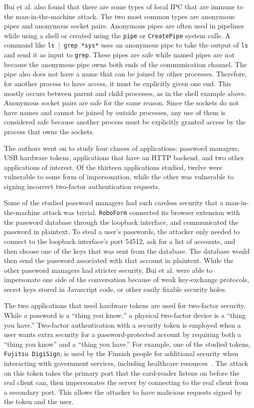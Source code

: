 Bui et al. also found that there are some types of local IPC that are immune to the man-in-the-machine attack.  The two most common types are anonymous pipes and anonymous socket pairs.  Anonymous pipes are often used in pipelines while using a shell or created using the \texttt{pipe} or \texttt{CreatePipe} system calls.  A command like \texttt{ls $|$ grep *sys*} uses an anonymous pipe to take the output of \texttt{ls} and send it as input to \texttt{grep}.  These pipes are safe while named pipes are not because the anonymous pipe owns both ends of the communication channel.  The pipe also does not have a name that can be joined by other processes.  Therefore, for another process to have access, it must be explicitly given one end.  This mostly occurs between parent and child processes, as in the shell example above.  Anonymous socket pairs are safe for the same reason.  Since the sockets do not have names and cannot be joined by outside processes, any use of them is considered safe because another process must be explicitly granted access by the process that owns the sockets.

The authors went on to study four classes of applications: password managers, USB hardware tokens, applications that have an HTTP backend, and two other applications of interest.  Of the thirteen applications studied, twelve were vulnerable to some form of impersonation, while the other was vulnerable to signing incorrect two-factor authentication requests.

Some of the studied password managers had such careless security that a man-in-the-machine attack was trivial.  \texttt{RoboForm} connected its browser extension with the password database through the loopback interface, and communicated the password in plaintext.  To steal a user's passwords, the attacker only needed to connect to the loopback interface's port 54512, ask for a list of accounts, and then choose one of the keys that was sent from the database.  The database would then send the password associated with that account in plaintext.  While the other password managers had stricter security, Bui et al. were able to impersonate one side of the conversation because of weak key-exchange protocols, secret keys stored in Javascript code, or other easily fixable security holes.

The two applications that used hardware tokens are used for two-factor security.  While a password is a ``thing you know,'' a physical two-factor device is a ``thing you have.''  Two-factor authentication with a security token is employed when a user wants extra security for a password-protected account by requiring both a ``thing you know'' and a ``thing you have.''  For example, one of the studied tokens, \texttt{Fujitsu DigiSign}, is used by the Finnish people for additional security when interacting with government services, including healthcare resources~\cite{MitMa}.  The attack on this token takes the primary port that the card-reader listens on before the real client can, then impersonates the server by connecting to the real client from a secondary port.  This allows the attacker to have malicious requests signed by the token and the user.

